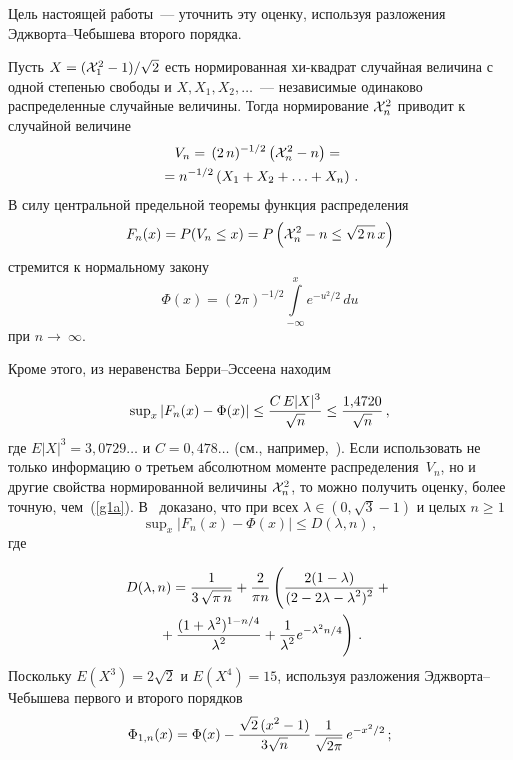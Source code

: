 \begin{multicols}{2}
 \smallskip
 
Цель настоящей работы~--- уточнить эту оценку, используя  разложения Эджворта--Чебышева второго порядка.
\smallskip

Пусть $X= ({\cal X}_1^2 - 1)/\sqrt{2}$ есть нормированная хи-квадрат случайная величина 
с одной степенью свободы и   $X, X_1, X_2,\ldots$~--- независимые одинаково распределенные 
случайные величины. Тогда нормирование  ${\cal X}_n^2$ приводит к случайной величине
\begin{multline*}
V_n =\,(2\,n)^{-1/2}\left({\cal X}_n^2-n\right)= {}\\
{}=n^{-1/2}\left(X_1 + X_2 + \ldots + X_n\right)\,. 
\end{multline*}
В силу центральной предельной теоремы функция распределения
$$ 
F_n(x) = P(V_n \leq x)=P\left({\cal X}_n^2-n \leq \sqrt{2\,n}\,x\right)
$$
стремится к нормальному закону   
$$ 
\Phi(x) =  (2\pi)^{-1/2} \int\limits_{- \infty}^x e^{-u^2/2}\,du 
$$
при $n \rightarrow~\infty$.

Кроме этого, из неравенства Берри--Эссеена находим

\noindent
\begin{equation}
\label{g1a}
\sup\nolimits_x |F_n(x) - \Phi(x)| \leq \displaystyle\frac{\displaystyle C\,E|X|^3 \mathstrut}{\displaystyle  \sqrt{n}\mathstrut} \leq \displaystyle\frac{\displaystyle 1{,}4720\mathstrut}{\displaystyle \sqrt{n}\mathstrut}\,,
\end{equation}
где $E|X|^3 = 3{,}0729\ldots$ и $C = 0{,}478\ldots$ (см., например,~\cite{3-cr, 4-cr}).
%
Если использовать не только информацию о третьем абсолютном моменте распределения~$V_n$, 
но и другие свойства   нормированной величины  ${\cal X}_n^2$, то можно получить оценку, 
более точную, чем~(\ref{g1a}). В~\cite{5-cr} доказано, что
при всех $\lambda \in (0,\sqrt{3}-1)$  и целых $n\geq 1$
$$\sup\nolimits_x |F_n(x) - \Phi(x)| \leq D(\lambda, n)\,,
$$
где

\noindent
\begin{multline} 
D(\lambda, n) = \fr{1}{3\,\sqrt{\pi\,n}} +
\fr{2}{\pi n}\left(
\vphantom{\fr{(1+\lambda^2)^{1-n/4}}{\lambda^2}}
\fr{2(1-\lambda)}{(2-2\lambda - \lambda^2)^2} +{}\right.\\
\left.{}+
\fr{(1+\lambda^2)^{1-n/4}}{\lambda^2} +
\fr{1}{\lambda^2}e^{-\lambda^2 n/4}
\right)\,.
\label{g2}
\end{multline}
Поскольку   $E(X^3) = 2\sqrt{2}$ и $E(X^4)=15$, используя
разложения Эджворта--Чебышева первого и второго порядков
\begin{equation}
\label{g2a} 
\Phi_{1,n}(x) = \Phi (x) - \displaystyle\frac{\displaystyle \sqrt{2}\,(x^2-1)\mathstrut}{\displaystyle 3 \sqrt{n}\mathstrut}
\,\displaystyle\frac{\displaystyle 1\mathstrut}{\displaystyle \sqrt{2\pi}\mathstrut}\, e^{-x^2/2}\,;
\end{equation}


\end{multicols}
